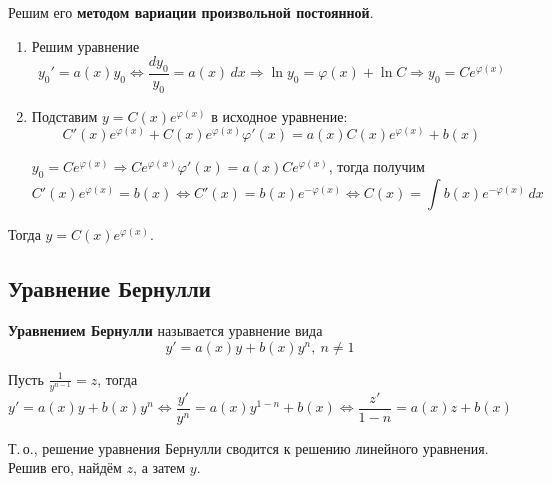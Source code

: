  Решим его \textbf{методом вариации произвольной постоянной}.
\begin{enumerate}
	\item Решим уравнение
	\begin{equation*}
	y_0' = a(x) y_0 \Leftrightarrow
	\frac{dy_0}{y_0} = a(x)\,dx \Rightarrow
	\ln y_0 = \varphi(x) + \ln C \Rightarrow
	y_0 = C e^{\varphi(x)}
	\end{equation*}
	
	\item Подставим $y = C(x) e^{\varphi(x)}$ в исходное уравнение:
	\begin{equation*}
	C'(x) e^{\varphi(x)} + C(x) e^{\varphi(x)} \varphi'(x) = a(x) C(x) e^{\varphi(x)} + b(x)
	\end{equation*}
	
	$y_0 = Ce^{\varphi(x)} \Rightarrow C e^{\varphi(x)} \varphi'(x) = a(x) C e^{\varphi(x)}$, тогда получим
	\begin{equation*}
	C'(x) e^{\varphi(x)} = b(x) \Leftrightarrow
	C'(x) = b(x) e^{-\varphi(x)} \Leftrightarrow
	C(x) = \int b(x) e^{-\varphi(x)}\,dx
	\end{equation*}
\end{enumerate}

Тогда $y = C(x) e^{\varphi(x)}$.

\subsection{Уравнение Бернулли}
 \textbf{Уравнением Бернулли} называется уравнение вида
\begin{equation*}
y' = a(x) y + b(x) y^n, \ n \neq 1
\end{equation*}

Пусть $\frac1{y^{n-1}} = z$, тогда
\begin{equation*}
y' = a(x) y + b(x) y^n \Leftrightarrow
\frac{y'}{y^n} = a(x) y^{1-n} + b(x) \Leftrightarrow
\frac{z'}{1 - n} = a(x) z + b(x)
\end{equation*}

Т.\,о., решение уравнения Бернулли сводится к решению линейного уравнения.
Решив его, найдём $z$, а затем $y$.

